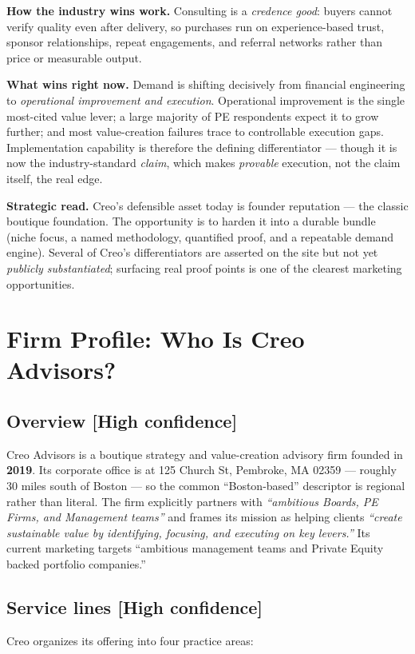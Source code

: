 \documentclass[11pt]{article}
\newcommand{\high}{\textcolor{green!45!black}{\textbf{[High confidence]}}}
\begin{document}
\textbf{How the industry wins work.} Consulting is a \emph{credence good}:
buyers cannot verify quality even after delivery, so purchases run on
experience-based trust, sponsor relationships, repeat engagements, and
referral networks rather than price or measurable output.

\textbf{What wins right now.} Demand is shifting decisively from financial
engineering to \emph{operational improvement and execution}. Operational
improvement is the single most-cited value lever; a large majority of PE
respondents expect it to grow further; and most value-creation failures trace
to controllable execution gaps. Implementation capability is therefore the
defining differentiator --- though it is now the industry-standard \emph{claim},
which makes \emph{provable} execution, not the claim itself, the real edge.

\textbf{Strategic read.} Creo's defensible asset today is founder reputation ---
the classic boutique foundation. The opportunity is to harden it into a durable
bundle (niche focus, a named methodology, quantified proof, and a repeatable
demand engine). Several of Creo's differentiators are asserted on the site but
not yet \emph{publicly substantiated}; surfacing real proof points is one of the
clearest marketing opportunities.

\section{Firm Profile: Who Is Creo Advisors?}

\subsection{Overview \high}
Creo Advisors is a boutique strategy and value-creation advisory firm founded in
\textbf{2019}. Its corporate office is at 125 Church St, Pembroke, MA 02359 ---
roughly 30 miles south of Boston --- so the common ``Boston-based'' descriptor is
regional rather than literal. The firm explicitly partners with
\emph{``ambitious Boards, PE Firms, and Management teams''} and frames its mission
as helping clients \emph{``create sustainable value by identifying, focusing, and
executing on key levers.''} Its current marketing targets ``ambitious management
teams and Private Equity backed portfolio companies.''

\subsection{Service lines \high}
Creo organizes its offering into four practice areas:
\end{document}
